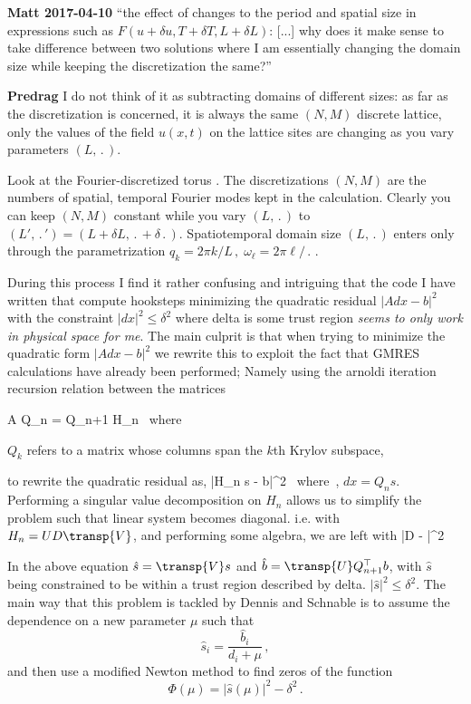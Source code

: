 {\bf Matt 2017-04-10} ``the effect of changes
to the period and spatial size in expressions such as $F(u + \delta u , T +
\delta T, L + \delta L)$: [...]  why does it make
sense to take difference between two solutions where I am essentially
changing the domain size while keeping the discretization the same?''

{\bf Predrag} I do not think of it as subtracting domains of different sizes:
as far as the discretization is concerned, it is always the same $(N,M)$
discrete lattice, only the values of the field $u(x,t)$ on the lattice sites
are changing as you vary parameters $(L,\period{})$.

Look at the Fourier-discretized torus . The
discretizations $(N,M)$ are the numbers of spatial, temporal Fourier modes
kept in the calculation. Clearly you can keep  $(N,M)$ constant while you
vary $(L,\period{})$ to $(L',\period{}')=(L+\delta L,\period{}+\delta\period{})$.
Spatiotemporal domain size $(L,\period{})$ enters only through the
parametrization
\(
q_k = {2 \pi k}/{L}
    \,,\;
\omega_\ell = {2 \pi \ell}/{\period{}}
\,.
\)





During this process I find it rather confusing and intriguing that the code I have written that
compute hooksteps minimizing the quadratic residual $|A dx - b |^2$ with the constraint $|dx|^2 \leq \delta^2$
where delta is some trust region \emph{seems to only work in physical space for me}. The main culprit is that
when trying to minimize the quadratic form $|A dx - b |^2$ we rewrite this to exploit the fact that
GMRES calculations have already been performed; Namely using the arnoldi iteration recursion relation between
the matrices

\beq \nonumber
A Q_n = Q_{n+1} H_n \, \mbox{where} \,
\eeq

$Q_k$ refers to a matrix whose columns span the $k$th Krylov subspace,

to rewrite the quadratic residual as,
\beq \nonumber
|H_n s - b|^2 \, \mbox{where} \,,
\eeq
$dx = Q_n s$. Performing a singular value decomposition on $H_n$ allows us to simplify the problem such that
linear system becomes diagonal. i.e. with $H_n = U D \transp{V}$, and performing some algebra, we are left with
\beq \nonumber
|D  - |^2
\eeq

In the above equation $\hat{s} = \transp{V} s $ and
$\hat{b} = \transp{U} Q_{n+1}^{\top} b$, with $\hat{s}$ being
constrained to be within a trust region described by delta. $|\hat{s}|^2 \leq
\delta^2$. The main way that this problem is tackled by Dennis and Schnable
 is to assume the dependence on a new parameter $\mu$ such that
\[
\hat{s}_i = \frac{\hat{b}_i}{d_i + \mu}
\,,
\]
and then use a modified Newton method to find zeros of the function
\[
\Phi (\mu) = |\hat{s}(\mu)|^2 - \delta^2
\,.
\]

